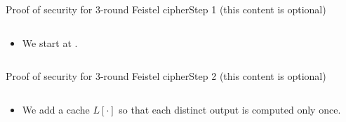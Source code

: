 \documentclass[aspectratio=169, lualatex, handout]{beamer}
\begin{document}
	\begin{frame}{Proof of security for 3-round Feistel cipher}{Step 1 (this content is optional)}
		\begin{columns}[c]
			\begin{column}{0.5\textwidth}
				\begin{itemize}
					\item We start at .
				\end{itemize}
			\end{column}
			\begin{column}{0.5\textwidth}
				\begin{center}
				\end{center}
			\end{column}
		\end{columns}
	\end{frame}

	\begin{frame}{Proof of security for 3-round Feistel cipher}{Step 2 (this content is optional)}
		\begin{columns}[c]
			\begin{column}{0.5\textwidth}
				\begin{itemize}
					\item We add a cache $L[\cdot]$ so that each distinct output is computed only once.
				\end{itemize}
			\end{column}
			\begin{column}{0.5\textwidth}
				\begin{center}
				\end{center}
			\end{column}
		\end{columns}
	\end{frame}
\end{document}
